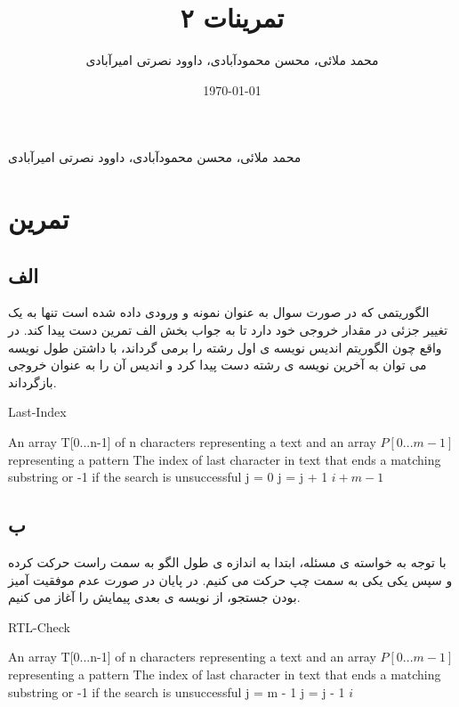 \documentclass{article}
\date{\today}
\title{تمرینات ۲}
\author{محمد ملائی، محسن محمودآبادی، داوود نصرتی امیرآبادی}
\begin{document}
\begin{center}
    {محمد ملائی،  محسن محمودآبادی،  داوود نصرتی امیرآبادی}
\end{center}
\pagebreak
\section{تمرین}
\subsection{الف}

الگوریتمی که در صورت سوال به عنوان نمونه و ورودی داده شده است تنها به یک تغییر جزئی در 
مقدار خروجی خود دارد تا به جواب بخش الف تمرین دست پیدا کند. در واقع چون الگوریتم اندیس نویسه ی اول رشته را 
برمی گرداند، با داشتن طول نویسه می توان به آخرین نویسه ی رشته دست پیدا کرد و اندیس آن را 
به عنوان خروجی بازگرداند.
\begin{latin}
    \begin{algorithm}
        \caption{Last-Index}
        \begin{algorithmic}
            \Require An array T[0...n-1] of n characters representing a text
            and an array $P[0...m-1]$ representing a pattern
            \Ensure The index of last character in text that ends a matching substring or -1 if the search is unsuccessful
                \State j = 0
                    \State j = j + 1
                \EndWhile
                    \State \Return $ i + m - 1$
                \EndIf
            \EndFor
            \State {}
        \end{algorithmic}
    \end{algorithm}
\end{latin}
\subsection{ب}
با توجه به خواسته ی مسئله،
ابتدا به اندازه ی طول الگو به سمت راست حرکت کرده و سپس یکی یکی به سمت چپ
حرکت می کنیم.  در پایان در صورت عدم موفقیت آمیز بودن جستجو، از نویسه ی بعدی پیمایش را آغاز می کنیم.
\begin{latin}
    \begin{algorithm}
        \caption{RTL-Check}
        \begin{algorithmic}
            \Require An array T[0...n-1] of n characters representing a text
            and an array $P[0...m-1]$ representing a pattern
            \Ensure The index of last character in text that ends a matching substring or -1 if the search is unsuccessful
                \State j = m - 1
                    \State j = j - 1
                \EndWhile
                    \State \Return $ i $
                \EndIf
            \EndFor
            \State {}
        \end{algorithmic}
    \end{algorithm}
\end{latin}
\end{document}
